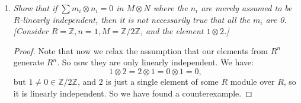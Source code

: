 \documentclass[10pt,oneside,reqno]{amsart}
\theoremstyle{plain}
\theoremstyle{definition}
\theoremstyle{remark}
\newcommand{\z}{\mathbb{Z}}
\newcommand{\tens}{\otimes}
\begin{document}
\begin{enumerate}[label=\arabic*.]
\begin{enumerate}
\begin{proof}
So letting $m_i = (a_1r_{1,i}u_1 \cdots + a_lr_{l,i}u_l)$, we set:
$$
t = \sum_{i = 1}^n m_i \tens e_i = 0,
$$
where $m_i \in M$. But note we also have:
$$
\sum_{i = 1}^n 0 \tens e_i = 0.
$$
So since we just proved the representation above is unique, we know we must have $m_i = 0$ $\forall i$. 
\begin{comment}
So letting $m_i = (a_1r_{1,i}u_1 \cdots + a_lr_{l,i}u_l)$, we have:
$$
t = \sum_{i = 1}^n m_i \tens e_i,
$$
where $m_i \in M$. Assume that $\sum_{i = 1}^n m_i \tens e_i = 0$. If each term in the sum is identically zero, then the result is proved, all $m_i = 0$. So without loss of generality, assume $m_1,...,m_k \neq 0$ for some $k \leq n$. If the $m_i$'s are linearly independent, then since the $e_i$'s are also linearly independent:
$$
\sum_{i = 1}^n m_i \tens e_i = 0 \Rightarrow m_i = 0, \forall i,
$$ which is a contradiction. So then we must have that the $m_i$'s are linearly dependent. So we can write: 
$$
\sum_{i  =1}^k m_i \tens e_i = \sum_{i  =1}^k r_i  m \tens e_i = \sum_{i  =1}^k   m \tens r_ie_i = 0.
$$
If $m = 0$ we are done, contradiction, since then $m_i = 0$ for all $i$. If $\sum r_ie_i = 0$ we have a contradiction, since then the basis wouldn't be linearly independent. So we must have that all $m_i = 0$. 
\end{comment}
\end{proof}

\item \textit{Show that if $\sum m_i \tens n_i = 0$ in $M \tens N$ where the $n_i$ are merely assumed to be $R$-linearly independent, then it is not necessarily true that all the $m_i$ are 0. [Consider $R = \z,n  =1,M = \z/2\z$, and the element $1 \tens 2$.] }
\begin{proof}
Note that now we relax the assumption that our elements from $R^n$ generate $R^n$. So now they are only linearly independent. We have:
$$
1 \tens 2 = 2 \tens 1 = 0 \tens 1 = 0,
$$
but $1 \neq 0 \in \z/2\z$, and $2$ is just a single element of some $R$ module over $R$, so it is linearly independent. So we have found a counterexample. 
\end{proof}
\end{enumerate}

\setcounter{enumi}{15}

\begin{comment}
\item \textit{Prove that $M \tens (N \oplus K) \cong (M \tens N) \oplus (M \tens K)$. The same is true for: 
$$
M \tens \left( \bigoplus_{\alpha \in \Lambda} N_\alpha \right) \cong \bigoplus_{\alpha \in \Lambda}(M \tens N_\alpha),
$$ 
which uses the same proof. But:
$$
M \tens \left( \prod_{\alpha \in \Lambda} N_\alpha \right)\cong \prod_{\alpha \in \Lambda}(M \tens N_\alpha).
$$
}


\end{comment}
\end{enumerate}
\end{document}
